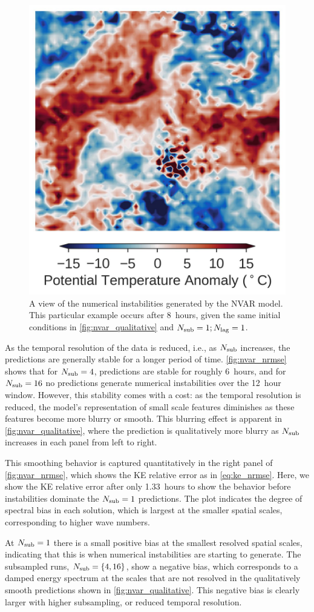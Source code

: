 \begin{figure}
    \centering
    \includegraphics[width=.3\textwidth]{../figures/nvar_instabilities.jpg}
    \caption{A view of the numerical instabilities generated by the NVAR model.
        This particular example occurs after 8~hours, given the same initial
        conditions in \cref{fig:nvar_qualitative} and $N_\text{sub}=1; N_\text{lag}=1$.
    }

    \label{fig:nvar_instabilities}
\end{figure}

As the temporal resolution of the data is reduced, i.e., as $N_\text{sub}$ increases,
the predictions are generally stable for a longer period of time.
\cref{fig:nvar_nrmse} shows that for $N_\text{sub}=4$, predictions are stable for roughly
6~hours, and for $N_\text{sub}=16$ no predictions generate numerical instabilities over the
12~hour window.
However, this stability comes with a cost: as the temporal resolution is
reduced, the model's representation of small scale features diminishes as these
features become more blurry or smooth.
This blurring effect is apparent in \cref{fig:nvar_qualitative}, where the
prediction is qualitatively more blurry as
$N_\text{sub}$ increases in each panel from left to right.

This smoothing behavior is captured quantitatively in the right panel of
\cref{fig:nvar_nrmse},
which shows the KE relative error as in \cref{eq:ke_nrmse}.
Here, we show the KE relative error after only 1.33~hours to show the behavior
before instabilities dominate the $N_\text{sub}=1$ predictions.
The plot indicates the degree of spectral bias in each solution, which is
largest at the smaller spatial scales, corresponding to higher wave numbers.

At $N_\text{sub}=1$ there is a small positive bias at the smallest resolved spatial
scales, indicating that this is when numerical instabilities are starting to
generate.
The subsampled runs, $N_\text{sub}=\{4,16\}$, show a negative bias, which corresponds
to a damped energy spectrum at the scales that are not resolved in the
qualitatively smooth predictions shown in \cref{fig:nvar_qualitative}.
This negative bias is clearly larger with higher subsampling, or reduced
temporal resolution.


